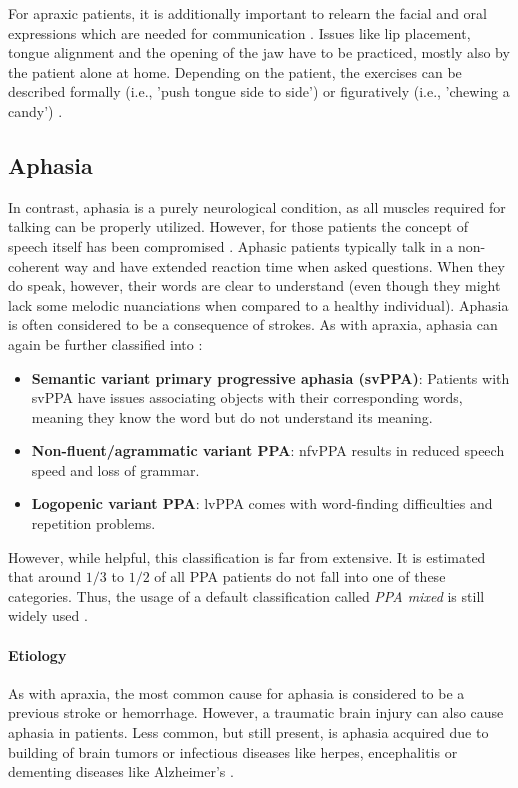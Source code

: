 \documentclass[draft,final]{vutinfth} %
\begin{document}
For apraxic patients, it is additionally important to relearn the facial and oral expressions which are needed for communication \cite{ogar2005apraxia}. Issues like lip placement, tongue alignment and the opening of the jaw have to be practiced, mostly also by the patient alone at home. Depending on the patient, the exercises can be described formally (i.e., 'push tongue side to side') or figuratively (i.e., 'chewing a candy') \cite{proestler2023}.
\subsection{Aphasia}
In contrast, aphasia is a purely neurological condition, as all muscles required for talking can be properly utilized. However, for those patients the concept of speech itself has been compromised \cite{clark2003aphasia}. Aphasic patients typically talk in a non-coherent way and have extended reaction time when asked questions. When they do speak, however, their words are clear to understand (even though they might lack some melodic nuanciations when compared to a healthy individual). Aphasia is often considered to be a consequence of strokes. As with apraxia, aphasia can again be further classified into \cite{ulugut2022natural}:
\begin{itemize}
\item \textbf{Semantic variant primary progressive aphasia (svPPA)}: Patients with svPPA have issues associating objects with their corresponding words, meaning they know the word but do not understand its meaning.
\item \textbf{Non-fluent/agrammatic variant PPA}: nfvPPA results in reduced speech speed and loss of grammar.
\item \textbf{Logopenic variant PPA}: lvPPA comes with word-finding difficulties and repetition problems. 
\end{itemize}

However, while helpful, this classification is far from extensive. It is estimated that around $1/3$ to $1/2$ of all PPA patients do not fall into one of these categories. Thus, the usage of a default classification called \emph{PPA mixed} is still widely used \cite{ulugut2022natural}.

\paragraph{Etiology} As with apraxia, the most common cause for aphasia is considered to be a previous stroke or hemorrhage. However, a traumatic brain injury can also cause aphasia in patients. Less common, but still present, is aphasia acquired due to building of brain tumors or infectious diseases like herpes, encephalitis or dementing diseases like Alzheimer's \cite{clark2003aphasia}.
\end{document}
